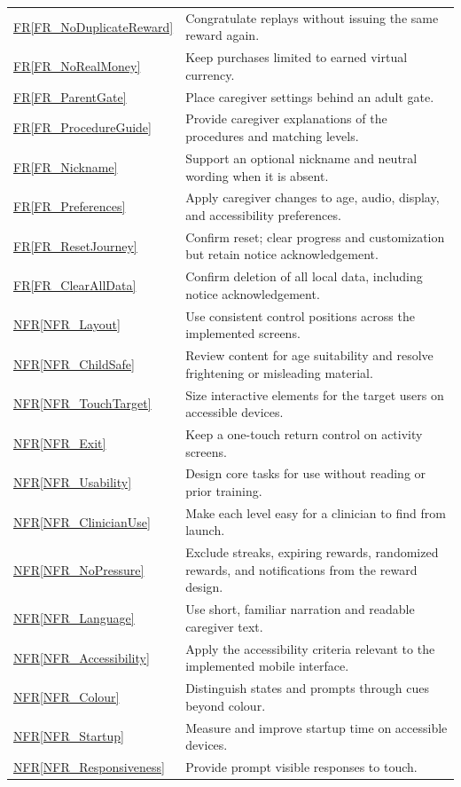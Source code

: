 \documentclass[10pt]{article}
\newcommand{\rref}[1]{\hyperref[#1]{FR\ref*{#1}}}
\newcommand{\nfrref}[1]{\hyperref[#1]{NFR\ref*{#1}}}
\begin{document}
\begin{longtable}{@{}>{\raggedright\arraybackslash}p{}
>{\raggedright\arraybackslash}p{}@{}}
\rref{FR_NoDuplicateReward} & Congratulate replays without issuing the same reward again. \\
\rref{FR_NoRealMoney} & Keep purchases limited to earned virtual currency. \\
\rref{FR_ParentGate} & Place caregiver settings behind an adult gate. \\
\rref{FR_ProcedureGuide} & Provide caregiver explanations of the procedures and matching levels. \\
\rref{FR_Nickname} & Support an optional nickname and neutral wording when it is absent. \\
\rref{FR_Preferences} & Apply caregiver changes to age, audio, display, and accessibility preferences. \\
\rref{FR_ResetJourney} & Confirm reset; clear progress and customization but retain notice acknowledgement. \\
\rref{FR_ClearAllData} & Confirm deletion of all local data, including notice acknowledgement. \\
\nfrref{NFR_Layout} & Use consistent control positions across the implemented screens. \\
\nfrref{NFR_ChildSafe} & Review content for age suitability and resolve frightening or misleading material. \\
\nfrref{NFR_TouchTarget} & Size interactive elements for the target users on accessible devices. \\
\nfrref{NFR_Exit} & Keep a one-touch return control on activity screens. \\
\nfrref{NFR_Usability} & Design core tasks for use without reading or prior training. \\
\nfrref{NFR_ClinicianUse} & Make each level easy for a clinician to find from launch. \\
\nfrref{NFR_NoPressure} & Exclude streaks, expiring rewards, randomized rewards, and notifications from the reward design. \\
\nfrref{NFR_Language} & Use short, familiar narration and readable caregiver text. \\
\nfrref{NFR_Accessibility} & Apply the accessibility criteria relevant to the implemented mobile interface. \\
\nfrref{NFR_Colour} & Distinguish states and prompts through cues beyond colour. \\
\nfrref{NFR_Startup} & Measure and improve startup time on accessible devices. \\
\nfrref{NFR_Responsiveness} & Provide prompt visible responses to touch. \\

\end{longtable}
\end{document}
